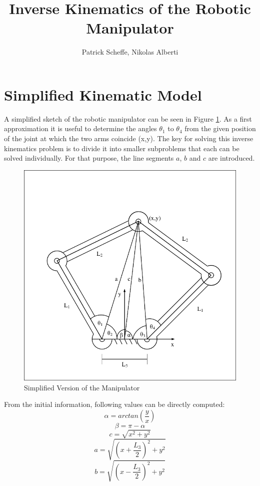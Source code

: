 \documentclass[11pt, oneside]{article}   %
\title{Inverse Kinematics of the Robotic Manipulator}
\author{Patrick Scheffe, Nikolas Alberti}
\begin{document}
\maketitle

\section{Simplified Kinematic Model}\label{section1}

A simplified sketch of the robotic manipulator can be seen in Figure \ref{fig:model}.
As a first approximation it is useful to determine the angles $\theta_1$ to $\theta_4$ from the given position of the joint at which the two arms coincide (x,y). The key for solving this inverse kinematics problem is to divide it into smaller subproblems that each can be solved individually. For that purpose, the line segments $a$, $b$ and $c$ are introduced.
\begin{figure}[!h]
\label{fig:model}
  \centering
      \includegraphics[scale=1]{LinkDiagramSimple_try.pdf}
  \caption{Simplified Version of the Manipulator}
\end{figure}

From the initial information, following values can be directly computed:
\begin{equation}
\alpha = arctan \left( \frac{y}{x} \right)
\end{equation}
\begin{equation}
\beta = \pi - \alpha
\end{equation}
\begin{equation}
c = \sqrt{x^2 + y^2}
\end{equation}
\begin{equation}
a = \sqrt{\left(x+ \frac{L_3}{2}\right)^2 + y^2}
\end{equation}
\begin{equation}
b = \sqrt{\left(x- \frac{L_3}{2}\right)^2 + y^2}
\end{equation}
\end{document}
